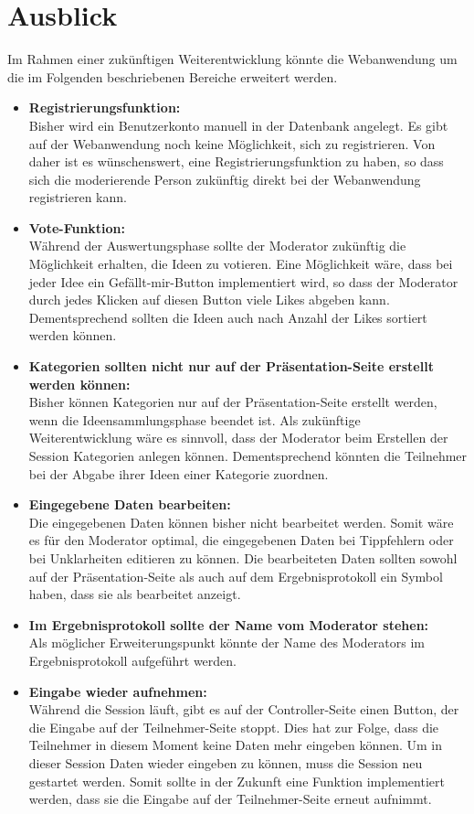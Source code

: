 \section{Ausblick}
\label{sec:Ausblick}
Im Rahmen einer zukünftigen Weiterentwicklung könnte die Webanwendung um die im Folgenden beschriebenen Bereiche erweitert werden.

\begin{itemize}
\item \textbf{Registrierungsfunktion:}\\
Bisher wird ein Benutzerkonto manuell in der Datenbank angelegt. Es gibt auf der Webanwendung noch keine Möglichkeit, sich zu registrieren. Von daher ist es wünschenswert, eine Registrierungsfunktion zu haben, so dass sich die moderierende Person zukünftig direkt bei der Webanwendung registrieren kann.
\item \textbf{Vote-Funktion:}\\
Während der Auswertungsphase sollte der Moderator zukünftig die Möglichkeit erhalten, die Ideen zu votieren. Eine Möglichkeit wäre, dass bei jeder Idee ein Gefällt-mir-Button implementiert wird, so dass der Moderator durch jedes Klicken auf diesen Button viele Likes abgeben kann. Dementsprechend sollten die Ideen auch nach Anzahl der Likes sortiert werden können.
\item \textbf{Kategorien sollten nicht nur auf der Präsentation-Seite erstellt werden können:}\\
Bisher können Kategorien nur auf der Präsentation-Seite erstellt werden, wenn die Ideensammlungsphase beendet ist. Als zukünftige Weiterentwicklung wäre es sinnvoll, dass der Moderator beim Erstellen der Session Kategorien anlegen können. Dementsprechend könnten die Teilnehmer bei der Abgabe ihrer Ideen einer Kategorie zuordnen. 
\item \textbf{Eingegebene Daten bearbeiten:}\\
Die eingegebenen Daten können bisher nicht bearbeitet werden. Somit wäre es für den Moderator optimal, die eingegebenen Daten bei Tippfehlern oder bei Unklarheiten editieren zu können. Die bearbeiteten Daten sollten sowohl auf der Präsentation-Seite als auch auf dem Ergebnisprotokoll ein Symbol haben, dass sie als bearbeitet anzeigt.
\item \textbf{Im Ergebnisprotokoll sollte der Name vom Moderator stehen:}\\
Als möglicher Erweiterungspunkt könnte der Name des Moderators im Ergebnisprotokoll aufgeführt werden.
\item \textbf{Eingabe wieder aufnehmen:}\\
Während die Session läuft, gibt es auf der Controller-Seite einen Button, der die Eingabe auf der Teilnehmer-Seite stoppt. Dies hat zur Folge, dass die Teilnehmer in diesem Moment keine Daten mehr eingeben können. Um in dieser Session Daten wieder eingeben zu können, muss die Session neu gestartet werden. Somit sollte in der Zukunft eine Funktion implementiert werden, dass sie die Eingabe auf der Teilnehmer-Seite erneut aufnimmt.
\end{itemize}
